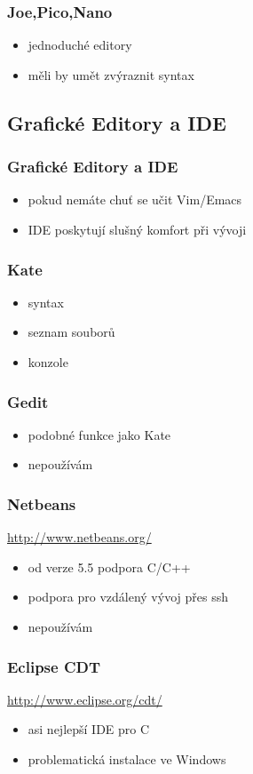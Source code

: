 \begin{frame}
	\frametitle{Joe,Pico,Nano}
	\begin{itemize}
		\item{jednoduché editory}
		\item{měli by umět zvýraznit syntax}
	\end{itemize}
\end{frame}

\subsection{Grafické Editory a IDE}

\begin{frame}
	\frametitle{Grafické Editory a IDE}
	\begin{itemize}
		\item{pokud nemáte chuť se učit Vim/Emacs}
		\item{IDE poskytují slušný komfort při vývoji}
	\end{itemize}
\end{frame}

\begin{frame}
	\frametitle{Kate}
	\begin{itemize}
		\item{syntax}
		\item{seznam souborů}
		\item{konzole}
	\end{itemize}
\end{frame}

\begin{frame}
	\frametitle{Gedit}
	\begin{itemize}
		\item{podobné funkce jako Kate}
		\item{nepoužívám}
	\end{itemize}
\end{frame}

\begin{frame}
	\frametitle{Netbeans}
	\href{http://www.netbeans.org/}{http://www.netbeans.org/}
	\begin{itemize}
		\item{od verze 5.5 podpora C/C++}
		\item{podpora pro vzdálený vývoj přes ssh}
		\item{nepoužívám}
	\end{itemize}
\end{frame}

\begin{frame}
	\frametitle{Eclipse CDT}
	\href{http://www.eclipse.org/cdt/}{http://www.eclipse.org/cdt/}
	\begin{itemize}
		\item{asi nejlepší IDE pro C}
		\item{problematická instalace ve Windows}
	\end{itemize}
\end{frame}

